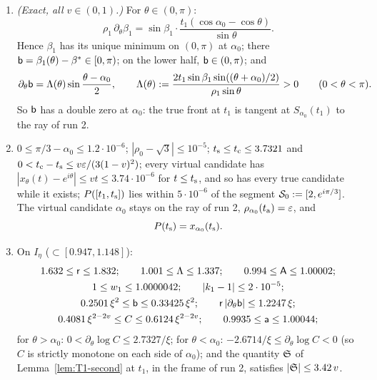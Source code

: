 \begin{lemma}\label{lem:T1-tang}
\begin{enumerate}
\item[(a)] \emph{(Exact, all $v\in(0,1)$.)} For $\theta\in(0,\pi)$:
\[
\rho_1\,\partial_\theta\beta_1=\sin\beta_1\cdot\frac{t_1(\cos\alpha_0-\cos\theta)}{\sin\theta}.
\]
Hence $\beta_1$ has its unique minimum on $(0,\pi)$ at $\alpha_0$; there $\mathsf b=\beta_1(\theta)-\beta^*\in[0,\pi)$; on the lower half,
$\mathsf b\in(0,\pi)$; and
\[
\partial_\theta\mathsf b=\Lambda(\theta)\sin\frac{\theta-\alpha_0}2,\qquad
\Lambda(\theta):=\frac{2t_1\sin\beta_1\sin((\theta+\alpha_0)/2)}{\rho_1\sin\theta}>0\qquad(0<\theta<\pi).
\]
So $\mathsf b$ has a double zero at $\alpha_0$: the true front at $t_1$ is tangent at $S_{\alpha_0}(t_1)$ to the ray of run 2.
\item[(b)] $0\le\pi/3-\alpha_0\le1.2\cdot10^{-6}$; $|\rho_0-\sqrt3|\le10^{-5}$; $t_{\mathrm s}\le t_{\mathrm c}\le3.7321$ and
$0<t_{\mathrm c}-t_{\mathrm s}\le v\varepsilon/(3(1-v)^2)$; every virtual candidate has $|x_\theta(t)-e^{i\theta}|\le vt\le3.74\cdot10^{-6}$ for
$t\le t_{\mathrm s}$, and so has every true candidate while it exists; $P([t_1,t_{\mathrm s}])$ lies within $5\cdot10^{-6}$ of the segment
$\mathcal S_0:=[2,e^{i\pi/3}]$. The virtual candidate $\alpha_0$ stays on the ray of run 2, $\rho_{\alpha_0}(t_{\mathrm a})=\varepsilon$, and
\[
P(t_{\mathrm s})=x_{\alpha_0}(t_{\mathrm s}).
\]
\item[(c)] On $I_\eta$ ($\subset[0.947,1.148]$):
\begin{gather*}
1.632\le\mathsf r\le1.832;\qquad1.001\le\Lambda\le1.337;\qquad0.994\le\mathsf A\le1.00002;\\
1\le w_1\le1.0000042;\qquad|k_1-1|\le2\cdot10^{-5};\\
0.2501\,\xi^2\le\mathsf b\le0.33425\,\xi^2;\qquad\mathsf r\,|\partial_\theta\mathsf b|\le1.2247\,\xi;\\
0.4081\,\xi^{2-2v}\le C\le0.6124\,\xi^{2-2v};\qquad0.9935\le\mathsf a\le1.00044;
\end{gather*}
for $\theta>\alpha_0$: $0<\partial_\theta\log C\le2.7327/\xi$; for $\theta<\alpha_0$: $-2.6714/\xi\le\partial_\theta\log C<0$ (so $C$ is
strictly monotone on each side of $\alpha_0$); and the quantity $\mathfrak S$ of Lemma~\ref{lem:T1-second} at $t_1$, in the frame of run 2,
satisfies $|\mathfrak S|\le3.42\,v$.
\end{enumerate}
\end{lemma}
